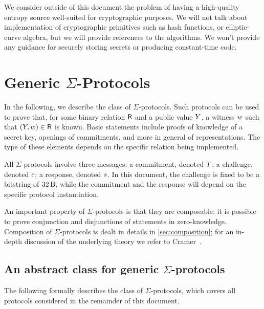 \documentclass[11pt]{article}
\begin{document}
We consider outside of this document the problem of having a high-quality
entropy source well-suited for crypto\-graphic purposes.
We will not talk about implementation of cryptographic primitives such as hash functions, or elliptic-curve algebra, but we will provide references to the algorithms.
We won't provide any guidance for securely storing secrets or producing constant-time code.

\section{Generic $\Sigma$-Protocols}
In the following, we describe the class of $\Sigma$-protocols.
Such protocols can be used to prove that, for some binary relation $\mathsf{R}$ and a public value $Y$, a witness $w$ such that $(Y,w)\in\mathsf{R}$ is known.
Basic statements include proofs of knowledge of a secret key, openings of commitments, and more in general of representations.
The type of these elements depends on the specific relation being implemented.

All $\Sigma$-protocols involve three messages: a commitment, denoted $T$; a challenge, denoted $c$; a response, denoted $s$.
In this document, the challenge is fixed to be a bitstring of $\seedlen$,
while the commitment and the response will depend on the specific protocol instantiation.

An important property of $\Sigma$-protocols is that they are composable: it is possible to prove conjunction and disjunctions of statements in zero-knowledge.
Composition of $\Sigma$-protocols is dealt in details in \cref{sec:composition}; for an in-depth discussion of the underlying theory we refer to Cramer~\cite{cramer97}.

\subsection{An abstract class for generic $\Sigma$-protocols}
The following formally describes the class of $\Sigma$-protocols, which covers all protocols considered in the remainder of this document.
\end{document}
